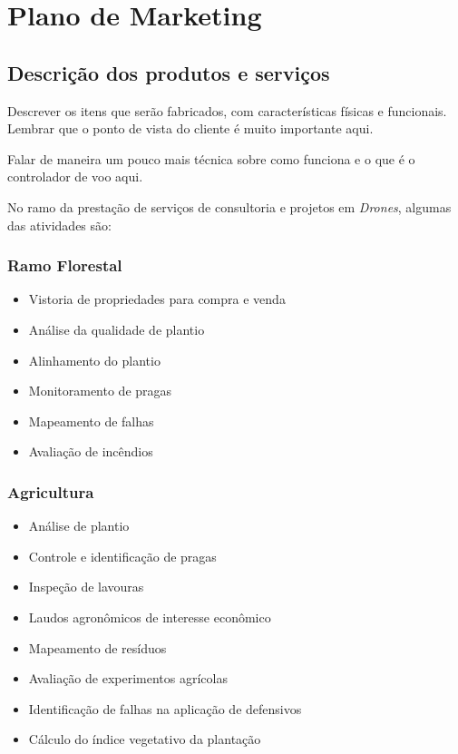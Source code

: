 \section{Plano de Marketing}

\subsection{Descrição dos produtos e serviços}

Descrever os itens que serão fabricados, com características físicas e funcionais.
Lembrar que o ponto de vista do cliente é muito importante aqui.

Falar de maneira um pouco mais técnica sobre como funciona e o que é o controlador de voo aqui.

No ramo da prestação de serviços de consultoria e projetos em \emph{Drones}, algumas das atividades
são:

\subsubsection*{Ramo Florestal}

\begin{itemize}
	\item Vistoria de propriedades para compra e venda
	\item Análise da qualidade de plantio
	\item Alinhamento do plantio
	\item Monitoramento de pragas
	\item Mapeamento de falhas
	\item Avaliação de incêndios
\end{itemize}

\subsubsection*{Agricultura}

\begin{itemize}
	\item Análise de plantio
	\item Controle e identificação de pragas
	\item Inspeção de lavouras
	\item Laudos agronômicos de interesse econômico
	\item Mapeamento de resíduos
	\item Avaliação de experimentos agrícolas
	\item Identificação de falhas na aplicação de defensivos
	\item Cálculo do índice vegetativo da plantação
\end{itemize}

